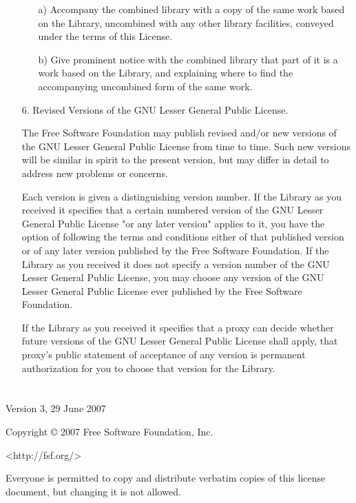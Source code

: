 \documentclass[twocolumn,twoside,fleqn,12pt]{article}
\begin{document}
\begin{itemize}
   \begin{itemize}
   \item[a)] Accompany the combined library with a copy of the same work based
   on the Library, uncombined with any other library facilities,
   conveyed under the terms of this License.

   \item[b)] Give prominent notice with the combined library that part of it
   is a work based on the Library, and explaining where to find the
   accompanying uncombined form of the same work.
   \end{itemize}

  \item[6.] Revised Versions of the GNU Lesser General Public License.

  The Free Software Foundation may publish revised and/or new versions
of the GNU Lesser General Public License from time to time. Such new
versions will be similar in spirit to the present version, but may
differ in detail to address new problems or concerns.

  Each version is given a distinguishing version number. If the
Library as you received it specifies that a certain numbered version
of the GNU Lesser General Public License "or any later version"
applies to it, you have the option of following the terms and
conditions either of that published version or of any later version
published by the Free Software Foundation. If the Library as you
received it does not specify a version number of the GNU Lesser
General Public License, you may choose any version of the GNU Lesser
General Public License ever published by the Free Software Foundation.

  If the Library as you received it specifies that a proxy can decide
whether future versions of the GNU Lesser General Public License shall
apply, that proxy's public statement of acceptance of any version is
permanent authorization for you to choose that version for the
Library.
\end{itemize}



\newpage
\section{}
\label{GnuGeneralSoftwareLicense}

\begin{center}

                       Version 3, 29 June 2007

\medskip
Copyright \copyright{} 2007 Free Software Foundation, Inc.

\medskip
<http://fsf.org/>

\bigskip
Everyone is permitted to copy and distribute verbatim copies of this
license document, but changing it is not allowed.

\end{center}
\end{document}
